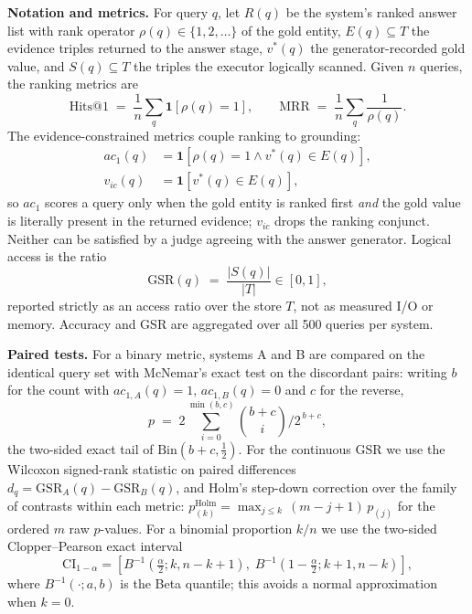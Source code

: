 \documentclass[a4paper,fleqn]{cas-dc}
\newcommand{\ac}[0]{\ensuremath{ac_1}}
\begin{document}
\textbf{Notation and metrics.} For query $q$, let $R(q)$ be the system's ranked
answer list with rank operator $\rho(q)\in\{1,2,\dots\}$ of the gold entity,
$E(q)\subseteq T$ the evidence triples returned to the answer stage, $v^{*}(q)$
the generator-recorded gold value, and $S(q)\subseteq T$ the triples the
executor logically scanned. Given $n$ queries, the ranking metrics are
\begin{equation}
\mathrm{Hits@1} \;=\; \frac{1}{n}\sum_{q}\mathbf{1}\!\left[\rho(q)=1\right],
\qquad
\mathrm{MRR} \;=\; \frac{1}{n}\sum_{q}\frac{1}{\rho(q)} .
\label{eq:rank}
\end{equation}
The evidence-constrained metrics couple ranking to grounding:
\begin{align}
\ac{}(q) &= \mathbf{1}\!\left[\rho(q)=1 \wedge v^{*}(q)\in E(q)\right],
\label{eq:ac1}\\
v_{ic}(q) &= \mathbf{1}\!\left[v^{*}(q)\in E(q)\right],
\label{eq:vic}
\end{align}
so \ac{} scores a query only when the gold entity is ranked first \emph{and}
the gold value is literally present in the returned evidence; $v_{ic}$ drops
the ranking conjunct. Neither can be satisfied by a judge agreeing with the
answer generator. Logical access is the ratio
\begin{equation}
\mathrm{GSR}(q)\;=\;\frac{|S(q)|}{|T|}\in[0,1],
\label{eq:gsr}
\end{equation}
reported strictly as an access ratio over the store $T$, not as measured
I/O or memory. Accuracy and GSR are aggregated over all 500 queries per
system.

\textbf{Paired tests.} For a binary metric, systems A and B are compared on
the identical query set with McNemar's exact test on the discordant pairs:
writing $b$ for the count with $ac_{1,A}(q)=1,\,ac_{1,B}(q)=0$ and $c$ for the
reverse,
\begin{equation}
p \;=\; 2\!\!\sum_{i=0}^{\min(b,c)}\!\!\binom{b+c}{i}\Big/2^{\,b+c},
\label{eq:mcnemar}
\end{equation}
the two-sided exact tail of $\mathrm{Bin}(b{+}c,\tfrac12)$. For the
continuous GSR we use the Wilcoxon signed-rank statistic on paired
differences $d_q=\mathrm{GSR}_A(q)-\mathrm{GSR}_B(q)$, and Holm's
step-down correction over the family of contrasts within each metric:
$p_{(k)}^{\mathrm{Holm}}=\max_{j\le k}\,(m{-}j{+}1)\,p_{(j)}$ for the ordered
$m$ raw $p$-values. For a binomial proportion $k/n$ we use the two-sided
Clopper--Pearson exact interval
\begin{equation}
\mathrm{CI}_{1-\alpha}=\left[B^{-1}\!\left(\tfrac{\alpha}{2};k,n-k+1\right),\;
B^{-1}\!\left(1-\tfrac{\alpha}{2};k+1,n-k\right)\right],
\label{eq:cp}
\end{equation}
where $B^{-1}(\cdot;a,b)$ is the Beta quantile; this avoids a normal
approximation when $k=0$.
\end{document}
